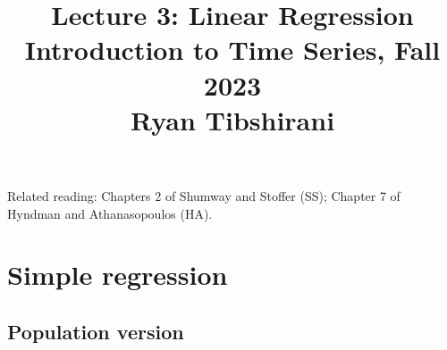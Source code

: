 \documentclass{article}
\title{Lecture 3: Linear Regression \\ \smallskip  
\large Introduction to Time Series, Fall 2023 \\ \smallskip
Ryan Tibshirani}
\date{}
\begin{document}
\maketitle
\RaggedRight
\vspace{-50pt}

Related reading: Chapters 2 of Shumway and Stoffer (SS); Chapter 7 of Hyndman
and Athanasopoulos (HA).   

\section{Simple regression}

\subsection{Population version}
\end{document}
